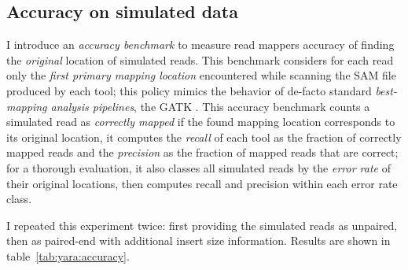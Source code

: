 \subsection{Accuracy on simulated data}

I introduce an \emph{accuracy benchmark} to measure read mappers accuracy of finding the \emph{original} location of simulated reads.
This benchmark considers for each read only the \emph{first primary mapping location} encountered while scanning the SAM file \citep{?} produced by each tool;
this policy mimics the behavior of de-facto standard \emph{best-mapping analysis pipelines}, \eg the GATK \citep{DePristo2011}.
This accuracy benchmark counts a simulated read as \emph{correctly mapped} if the found mapping location corresponds to its original location,
it computes the \emph{recall} of each tool as the fraction of correctly mapped reads and the \emph{precision} as the fraction of mapped reads that are correct;
for a thorough evaluation, it also classes all simulated reads by the \emph{error rate} of their original locations, then computes recall and precision within each error rate class.

I repeated this experiment twice: first providing the simulated reads as unpaired, then as paired-end with additional insert size information.
Results are shown in table~\ref{tab:yara:accuracy}.




